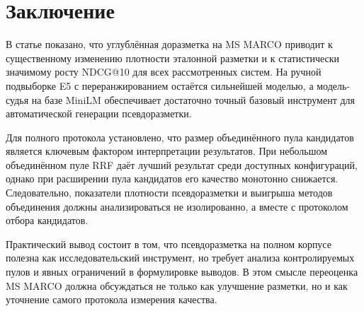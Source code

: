 \documentclass[10pt,a4paper,twocolumn]{article}
\begin{document}
\section{Заключение}

В статье показано, что углублённая доразметка на MS MARCO приводит к существенному изменению плотности эталонной разметки и к статистически значимому росту NDCG@10 для всех рассмотренных систем. На ручной подвыборке E5 с переранжированием остаётся сильнейшей моделью, а модель-судья на базе MiniLM обеспечивает достаточно точный базовый инструмент для автоматической генерации псевдоразметки.

Для полного протокола установлено, что размер объединённого пула кандидатов является ключевым фактором интерпретации результатов. При небольшом объединённом пуле RRF даёт лучший результат среди доступных конфигураций, однако при расширении пула кандидатов его качество монотонно снижается. Следовательно, показатели плотности псевдоразметки и выигрыша методов объединения должны анализироваться не изолированно, а вместе с протоколом отбора кандидатов.

Практический вывод состоит в том, что псевдоразметка на полном корпусе полезна как исследовательский инструмент, но требует анализа контролируемых пулов и явных ограничений в формулировке выводов. В этом смысле переоценка MS MARCO должна обсуждаться не только как улучшение разметки, но и как уточнение самого протокола измерения качества.
\end{document}
